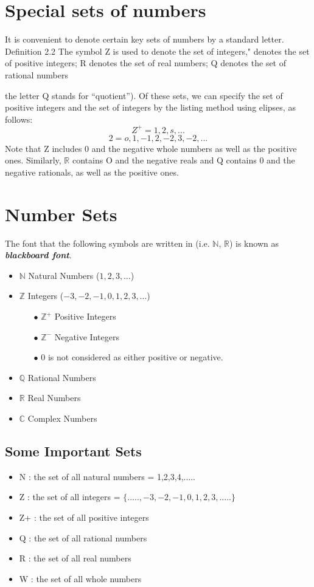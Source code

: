 \documentclass[11pt,a4paper,titlepage,oneside,openany]{article}
\numberwithin{equation}{section}
\numberwithin{algorithm}{section}
\numberwithin{figure}{section}
\numberwithin{table}{section}
\begin{document}
\section{Special sets of numbers}
\smallskip 
It is convenient to denote certain key sets of numbers by a standard letter.
Definition 2.2 
The symbol Z is used to denote the set of integers," 
 denotes the set of positive integers; 
 R denotes the set of real numbers;
Q denotes the set of rational numbers {the letter Q stands for “quotient”).
\smallskip 
\smallskip 
Of these sets, we can specify the set of positive integers and the set of integers by the listing method
using elipses, as follows:
\[Z^{+} = {1,2,s,...}\]
\[2 = {o,1,-1,2,-2,3,-2,...}\]
Note that Z includes 0 and the negative whole numbers as well as the positive ones. Similarly,
$\mathbb{R}$ contains O and the negative reals and Q contains 0 and the negative rationals, as well as the
positive ones.


\section*{Number Sets}
The font that the following symbols are written in (i.e. $\mathbb{N}$, $\mathbb{R}$) is known as \textit{\textbf{blackboard font}}.
\begin{itemize}
	\item $\mathbb{N}$ Natural Numbers ($1,2,3,\ldots$) 
	\item $\mathbb{Z}$ Integers ($-3,-2,-1,0,1,2,3, \ldots$)
	\begin{itemize}
		\item[$\bullet$] $\mathbb{Z}^{+}$ Positive Integers
		\item[$\bullet$] $\mathbb{Z}^{-}$ Negative Integers
		\item[$\bullet$] 0 is not considered as either positive or negative.
	\end{itemize}
	\item $\mathbb{Q}$ Rational Numbers
	\item $\mathbb{R}$ Real Numbers
	\item $\mathbb{C}$ Complex Numbers
\end{itemize}


\newpage
\subsection{Some Important Sets}
\begin{itemize}
\item N : the set of all natural numbers = {1,2,3,4,.....}
\item Z : the set of all integers = $\{.....,-3,-2,-1,0,1,2,3,.....\}$
\item Z+ : the set of all positive integers
\item Q : the set of all rational numbers
\item R : the set of all real numbers
\item W : the set of all whole numbers
\end{itemize}


}
\end{document}
